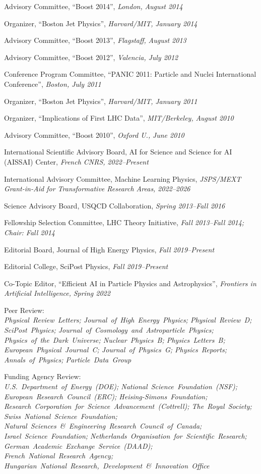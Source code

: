 \item Advisory Committee, ``Boost 2014'', \emph{London, }\emph{August 2014}
\item Organizer, ``Boston Jet Physics'', \emph{Harvard/MIT, }\emph{January 2014}
\item Advisory Committee, ``Boost 2013'', \emph{Flagstaff, }\emph{August 2013}
\item Advisory Committee, ``Boost 2012'', \emph{Valencia, }\emph{July 2012}
\item Conference Program Committee, ``PANIC 2011: Particle and Nuclei International Conference'', \emph{Boston, }\emph{July 2011}
\item Organizer, ``Boston Jet Physics'', \emph{Harvard/MIT, }\emph{January 2011}
\item Organizer, ``Implications of First LHC Data'', \emph{MIT/Berkeley, }\emph{August 2010}
\item Advisory Committee, ``Boost 2010'', \emph{Oxford U., }\emph{June 2010}
\item International Scientific Advisory Board, AI for Science and Science for AI (AISSAI) Center, \emph{French CNRS, }\emph{2022--Present}
\item International Advisory Committee, Machine Learning Physics, \emph{JSPS/MEXT Grant-in-Aid for Transformative Research Areas, }\emph{2022--2026}
\item Science Advisory Board, USQCD Collaboration, \emph{Spring 2013--Fall 2016}
\item Fellowship Selection Committee, LHC Theory Initiative, \emph{Fall 2013--Fall 2014; Chair: Fall 2014}
\item Editorial Board, Journal of High Energy Physics, \emph{Fall 2019--Present}
\item Editorial College, SciPost Physics, \emph{Fall 2019--Present}
\item Co-Topic Editor, ``Efficient AI in Particle Physics and Astrophysics'', \emph{Frontiers in Artificial Intelligence, }\emph{Spring 2022}
\item \raggedright Peer Review: \\ \textit{\nohyphens{Physical~Review~Letters; Journal~of~High~Energy~Physics; Physical~Review~D; SciPost~Physics; Journal~of~Cosmology~and~Astroparticle~Physics; Physics~of~the~Dark~Universe; Nuclear~Physics~B; Physics~Letters~B; European~Physical~Journal~C; Journal~of~Physics~G; Physics~Reports; Annals~of~Physics; Particle~Data~Group}}
\item \raggedright Funding Agency Review: \\ \textit{\nohyphens{U.S.~Department~of~Energy~(DOE); National~Science~Foundation~(NSF); European~Research~Council~(ERC); Heising-Simons~Foundation; Research~Corporation~for~Science~Advancement~(Cottrell); The~Royal~Society; Swiss~National~Science~Foundation; Natural~Sciences~\&~Engineering~Research~Council~of~Canada; Israel~Science~Foundation; Netherlands~Organisation~for~Scientific~Research; German~Academic~Exchange~Service~(DAAD); French~National~Research~Agency; Hungarian~National~Research,~Development~\&~Innovation~Office}}
